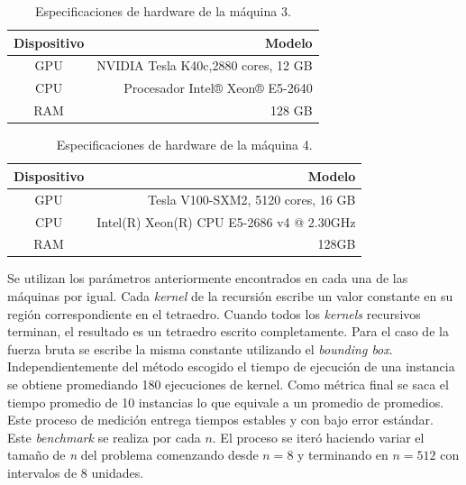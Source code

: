 \documentclass[10pt, conference, compsocconf, onecolumn]{IEEEtran}
\begin{document}
\begin{table}[H]
	\normalsize
	\caption{Especificaciones de hardware de la m\'aquina 3.}
	\begin{center}
		\begin{tabular}{|c|r|}
			\hline
			Dispositivo	&	Modelo\\
			\hline
			GPU	&	NVIDIA Tesla K40c,2880 cores, 12 GB\\
			CPU	&	Procesador Intel® Xeon® E5-2640\\
			RAM	&	128 GB\\
			\hline
		\end{tabular}
	\end{center}
	\label{table_TeslaK40}
\end{table}

\begin{table}[H]
	\normalsize
	\caption{Especificaciones de hardware de la m\'aquina 4.}
	\begin{center}
		\begin{tabular}{|c|r|}
			\hline
			Dispositivo	&	Modelo\\
			\hline
			GPU	&	Tesla V100-SXM2, 5120 cores, 16 GB \\
			CPU	&	Intel(R) Xeon(R) CPU E5-2686 v4 @ 2.30GHz\\
			RAM	&	128GB \\
			\hline
		\end{tabular}
	\end{center}
	\label{table_TeslaV100}
\end{table}
 Se utilizan los par\'ametros anteriormente encontrados en cada una de las m\'aquinas por igual. Cada \textit{kernel} de la recursi\'on escribe un valor constante en su regi\'on correspondiente en el tetraedro. Cuando todos los \textit{kernels} recursivos terminan, el resultado es un tetraedro escrito completamente. Para el caso de la fuerza bruta se escribe la misma constante utilizando el \textit{bounding box}. Independientemente del m\'etodo escogido el tiempo de ejecuci\'on de una instancia se obtiene promediando 180 ejecuciones de kernel. Como m\'etrica final se saca el tiempo promedio de  10 instancias lo que equivale a un promedio de promedios. Este proceso de medici\'on entrega tiempos estables y con bajo error est\'andar. Este \textit{benchmark}  se realiza por cada $n$. El proceso se iter\'o haciendo variar el tama\~no de \textit{n} del problema comenzando desde $n=8$ y terminando en $n=512$ con intervalos de 8 unidades.
 
\end{document}
